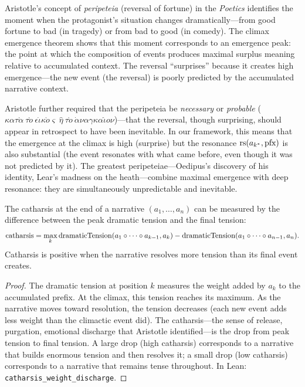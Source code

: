 \begin{interpretation}
Aristotle's concept of \emph{peripeteia} (reversal of fortune) in the \textit{Poetics} identifies the moment when the protagonist's situation changes dramatically---from good fortune to bad (in tragedy) or from bad to good (in comedy).  The climax emergence theorem shows that this moment corresponds to an emergence peak: the point at which the composition of events produces maximal surplus meaning relative to accumulated context.  The reversal ``surprises'' because it creates high emergence---the new event (the reversal) is poorly predicted by the accumulated narrative context.

Aristotle further required that the peripeteia be \emph{necessary} or \emph{probable} ($\kappa\alpha\tau\grave{\alpha}\ \tau\grave{o}\ \epsilon\dot{\iota}\kappa\grave{o}\varsigma\ \hat{\eta}\ \tau\grave{o}\ \dot{\alpha}\nu\alpha\gamma\kappa\alpha\hat{\iota}o\nu$)---that the reversal, though surprising, should appear in retrospect to have been inevitable.  In our framework, this means that the emergence at the climax is high (surprise) but the resonance $\mathrm{rs}(a_{k^*}, \text{pfx})$ is also substantial (the event resonates with what came before, even though it was not predicted by it).  The greatest peripeteiae---Oedipus's discovery of his identity, Lear's madness on the heath---combine maximal emergence with deep resonance: they are simultaneously unpredictable and inevitable.
\end{interpretation}

\begin{theorem}
\label{thm:catharsis-weight}
The catharsis at the end of a narrative $(a_1, \ldots, a_n)$ can be measured by the difference between the peak dramatic tension and the final tension:
\[
  \text{catharsis} = \max_k \text{dramaticTension}(a_1 \circ \cdots \circ a_{k-1}, a_k) - \text{dramaticTension}(a_1 \circ \cdots \circ a_{n-1}, a_n).
\]
Catharsis is positive when the narrative resolves more tension than its final event creates.
\end{theorem}

\begin{proof}
The dramatic tension at position $k$ measures the weight added by $a_k$ to the accumulated prefix.  At the climax, this tension reaches its maximum.  As the narrative moves toward resolution, the tension decreases (each new event adds less weight than the climactic event did).  The catharsis---the sense of release, purgation, emotional discharge that Aristotle identified---is the drop from peak tension to final tension.  A large drop (high catharsis) corresponds to a narrative that builds enormous tension and then resolves it; a small drop (low catharsis) corresponds to a narrative that remains tense throughout.  In Lean: \texttt{catharsis\_weight\_discharge}.
\end{proof}

